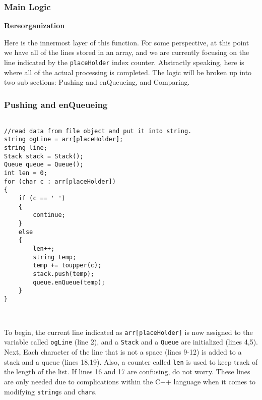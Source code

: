 \documentclass[letterpaper, 10pt]{article}
\begin{document}
 \subsubsection{Main Logic}
 
 \textbf{Rereorganization}
 
Here is the innermost layer of this function. For some perspective, at this point we have all of the lines stored in an array, and we are currently focusing on the line indicated by the \texttt{placeHolder} index counter. Abstractly speaking, here is where all of the actual processing is completed. The logic will be broken up into two sub sections: Pushing and enQueueing, and Comparing.


\subsubsection{Pushing and enQueueing}
\begin{addmargin}[-5em]{1em}
\begin{small}
 \begin{verbatim}
 
//read data from file object and put it into string.
string ogLine = arr[placeHolder];
string line;
Stack stack = Stack();
Queue queue = Queue();
int len = 0;
for (char c : arr[placeHolder])
{
    if (c == ' ')
    {
        continue;
    }
    else
    {
        len++;
        string temp;
        temp += toupper(c);
        stack.push(temp);
        queue.enQueue(temp);
    }
}

		
\end{verbatim}
\end{small}
 \end{addmargin}
  To begin, the current line indicated as \texttt{arr[placeHolder]} is now assigned to the variable called \texttt{ogLine} (line 2), and a \texttt{Stack} and a \texttt{Queue} are initialized (lines 4,5). Next, Each character of the line that is not a space (lines 9-12) is added to a stack and a queue (lines 18,19). Also, a counter called \texttt{len} is used to keep track of the length of the list. If lines 16 and 17 are confusing, do not worry. These lines are only needed due to complications within the C++ language when it comes to modifying \texttt{string}s and \texttt{char}s.
\newpage
\end{document}

